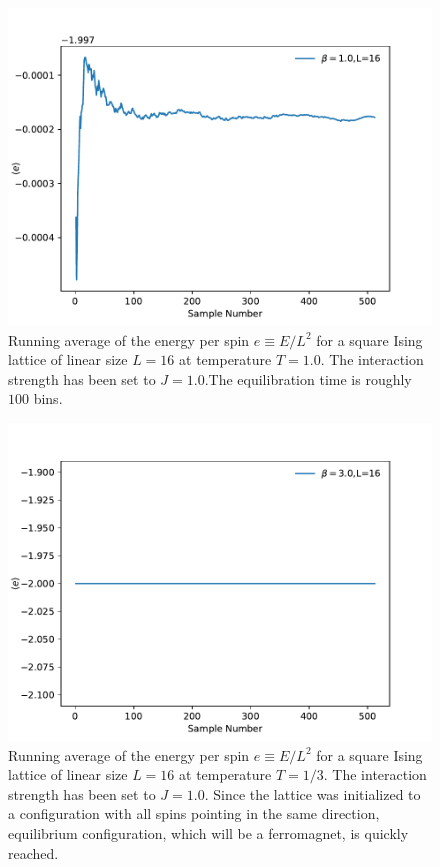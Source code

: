 \documentclass[12pt]{article}
\begin{document}
\begin{figure}[t]
\begin{center}
\includegraphics[width=0.7\columnwidth]{../Figures/a_equilibration_beta_1.0}
\end{center}
\caption{Running average of the energy per spin $e \equiv E/L^2$ for a square Ising lattice of linear size $L=16$ at temperature $T=1.0$. The interaction strength has been set to $J=1.0$.The equilibration time is roughly $100$ bins. }
\label{fig:equilibration1}
\end{figure}

\begin{figure}[t]
\begin{center}
\includegraphics[width=0.7\columnwidth]{../Figures/a_equilibration_beta_3.0}
\end{center}
\caption{Running average of the energy per spin $e \equiv E/L^2$ for a square Ising lattice of linear size $L=16$ at temperature $T=1/3$. The interaction strength has been set to $J=1.0$. Since the lattice was initialized to a configuration with all spins pointing in the same direction, equilibrium configuration, which will be a ferromagnet, is quickly reached.}
\label{fig:equilibration3}
\end{figure}
\end{document}
